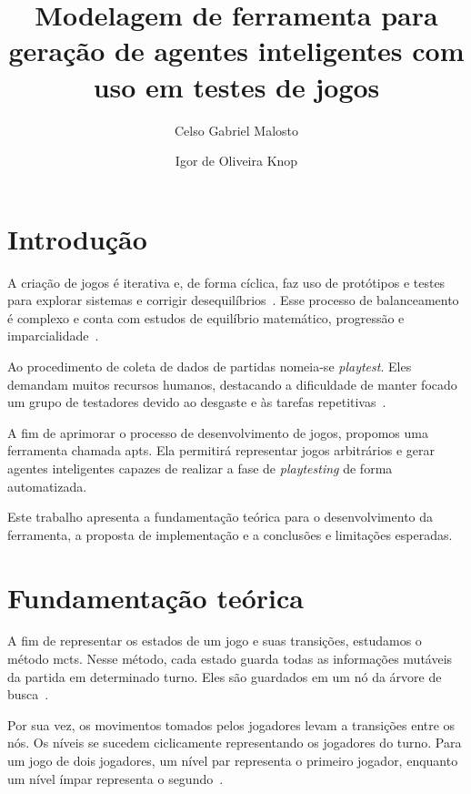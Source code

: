 \documentclass[12pt]{article}
\title{Modelagem de ferramenta para geração de agentes inteligentes com uso em testes de jogos}
\author{%
    Celso Gabriel Malosto\inst{1}%
    \and%
    Igor de Oliveira Knop\inst{1}
}
\begin{document}
\maketitle

\begin{abstract}

\end{abstract}

\begin{resumo}

\end{resumo}

\section{Introdução}%
\label{sec:introducao}

A criação de jogos é iterativa e, de forma cíclica, faz uso de protótipos e testes para explorar sistemas e corrigir desequilíbrios~\cite{marcelo2009design, fullerton2019game}.
Esse processo de balanceamento é complexo e conta com estudos de equilíbrio matemático, progressão e imparcialidade~\cite{romeroGameBalance2021}.

Ao procedimento de coleta de dados de partidas nomeia-se \textit{playtest}.
Eles demandam muitos recursos humanos, destacando a dificuldade de manter focado um grupo de testadores devido ao desgaste e às tarefas repetitivas~\cite{trzewiczek2017}.

A fim de aprimorar o processo de desenvolvimento de jogos, propomos uma ferramenta chamada \gls{apts}.
Ela permitirá representar jogos arbitrários e gerar agentes inteligentes capazes de realizar a fase de \textit{playtesting} de forma automatizada.

Este trabalho apresenta a fundamentação teórica para o desenvolvimento da ferramenta, a proposta de implementação e a conclusões e limitações esperadas.

\section{Fundamentação teórica}%
\label{sec:fundamentacao_teorica}

A fim de representar os estados de um jogo e suas transições, estudamos o método \gls{mcts}.
Nesse método, cada estado guarda todas as informações mutáveis da partida em determinado turno.
Eles são guardados em um nó da árvore de busca~\cite{kocsis2006bandit, coulom2006efficient}.

Por sua vez, os movimentos tomados pelos jogadores levam a transições entre os nós.
Os níveis se sucedem ciclicamente representando os jogadores do turno.
Para um jogo de dois jogadores, um nível par representa o primeiro jogador, enquanto um nível ímpar representa o segundo~\cite{mcts-swiechowski}.
\end{document}
